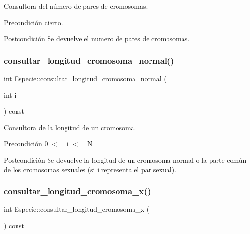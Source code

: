 Consultora del número de pares de cromosomas. 

\begin{DoxyPrecond}{Precondición}
cierto. 
\end{DoxyPrecond}
\begin{DoxyPostcond}{Postcondición}
Se devuelve el numero de pares de cromosomas. 
\end{DoxyPostcond}
\mbox{\label{class_especie_a54799405b10e46e0ea5723b72c7aa999}} 
\subsubsection{\texorpdfstring{consultar\+\_\+longitud\+\_\+cromosoma\+\_\+normal()}{consultar\_longitud\_cromosoma\_normal()}}
{\footnotesize\ttfamily int Especie\+::consultar\+\_\+longitud\+\_\+cromosoma\+\_\+normal (\begin{DoxyParamCaption}\item[{int}]{i }\end{DoxyParamCaption}) const}



Consultora de la longitud de un cromosoma. 

\begin{DoxyPrecond}{Precondición}
0 $<$= i $<$= N 
\end{DoxyPrecond}
\begin{DoxyPostcond}{Postcondición}
Se devuelve la longitud de un cromosoma normal o la parte común de los cromosomas sexuales (si i representa el par sexual). 
\end{DoxyPostcond}
\mbox{\label{class_especie_ab2da80d81baf641f18d7621838039e76}} 
\subsubsection{\texorpdfstring{consultar\+\_\+longitud\+\_\+cromosoma\+\_\+x()}{consultar\_longitud\_cromosoma\_x()}}
{\footnotesize\ttfamily int Especie\+::consultar\+\_\+longitud\+\_\+cromosoma\+\_\+x (\begin{DoxyParamCaption}{ }\end{DoxyParamCaption}) const}



